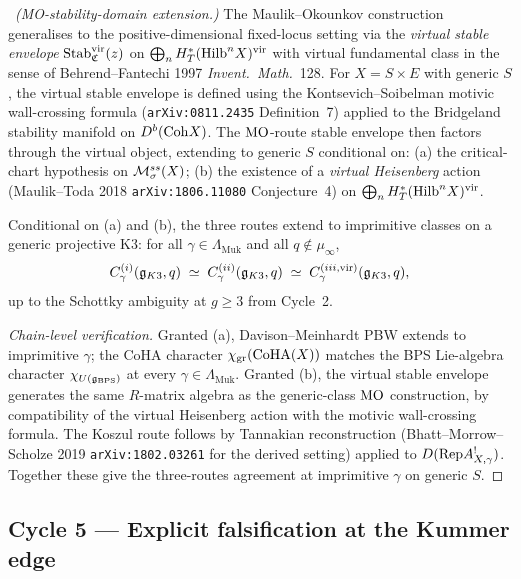 \ClaimStatusConjectured\ \emph{(MO-stability-domain extension.)} The
Maulik--Okounkov construction generalises to the
positive-dimensional fixed-locus setting via the
\emph{virtual stable envelope}
$\mathrm{Stab}^{\mathrm{vir}}_{\mathfrak{C}}(z)$ on
$\bigoplus_n H^*_T(\mathrm{Hilb}^n X)^{\mathrm{vir}}$ with virtual
fundamental class in the sense of Behrend--Fantechi 1997
\emph{Invent.\ Math.}\ 128. For $X = S \times E$ with generic $S$,
the virtual stable envelope is defined using the
Kontsevich--Soibelman motivic wall-crossing formula
(\texttt{arXiv:0811.2435} Definition~7) applied to the
Bridgeland stability manifold on $D^b(\mathrm{Coh} X)$. The
$\mathrm{MO}$-route stable envelope then factors through the virtual
object, extending to generic $S$ conditional on:
(a) the critical-chart hypothesis on $\mathcal{M}^{ss}_\sigma(X)$;
(b) the existence of a \emph{virtual Heisenberg} action
(Maulik--Toda 2018 \texttt{arXiv:1806.11080} Conjecture~4) on
$\bigoplus_n H^*_T(\mathrm{Hilb}^n X)^{\mathrm{vir}}$.

\begin{proposition}
\label{wn:prop:wave15-a10-cycle4}
Conditional on (a) and (b), the three routes extend to imprimitive
classes on a generic projective K$3$: for all
$\gamma \in \Lambda_{\mathrm{Muk}}$ and all $q \notin \mu_\infty$,
\[
  C^{(i)}_{\gamma}(\mathfrak{g}_{K3}, q)
  \;\simeq\;
  C^{(ii)}_{\gamma}(\mathfrak{g}_{K3}, q)
  \;\simeq\;
  C^{(iii, \mathrm{vir})}_{\gamma}(\mathfrak{g}_{K3}, q),
\]
up to the Schottky ambiguity at $g \geq 3$ from Cycle~2.
\end{proposition}

\begin{proof}[Chain-level verification]
Granted (a), Davison--Meinhardt PBW extends to imprimitive $\gamma$;
the CoHA character $\chi_{\mathrm{gr}}(\mathrm{CoHA}(X))$ matches the BPS
Lie-algebra character $\chi_{U(\mathfrak{g}_{\mathrm{BPS}})}$ at every
$\gamma \in \Lambda_{\mathrm{Muk}}$. Granted (b), the virtual stable
envelope generates the same $R$-matrix algebra as the generic-class
$\mathrm{MO}$ construction, by compatibility of the virtual Heisenberg
action with the motivic wall-crossing formula. The Koszul route
follows by Tannakian reconstruction
(Bhatt--Morrow--Scholze 2019 \texttt{arXiv:1802.03261} for the
derived setting) applied to $D(\mathrm{Rep} A^!_{X,\gamma})$.
Together these give the three-routes agreement at imprimitive
$\gamma$ on generic $S$.
\end{proof}

\subsection{Cycle 5 --- Explicit falsification at the Kummer edge}

